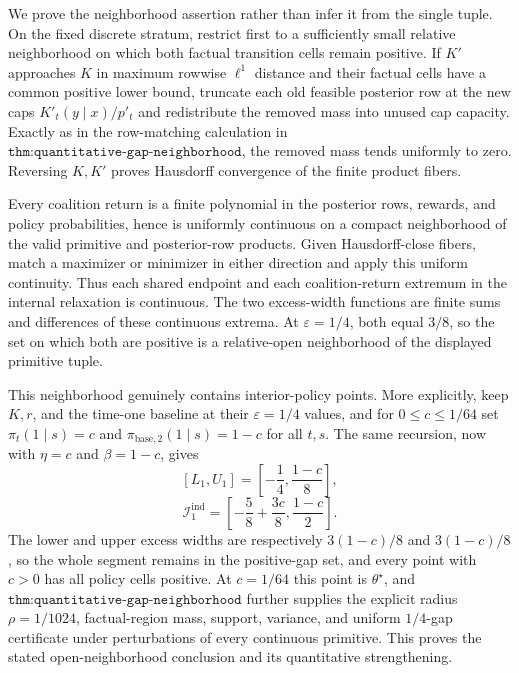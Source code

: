 We prove the neighborhood assertion rather than infer it from the single tuple.  On the fixed discrete stratum, restrict first to a sufficiently small relative neighborhood on which both factual transition cells remain positive.  If \(K'\) approaches \(K\) in maximum rowwise \(\ell^1\) distance and their factual cells have a common positive lower bound, truncate each old feasible posterior row at the new caps \(K'_t(y\mid x)/p'_t\) and redistribute the removed mass into unused cap capacity.  Exactly as in the row-matching calculation in \(\texttt{thm:quantitative-gap-neighborhood}\), the removed mass tends uniformly to zero.  Reversing \(K,K'\) proves Hausdorff convergence of the finite product fibers.

Every coalition return is a finite polynomial in the posterior rows, rewards, and policy probabilities, hence is uniformly continuous on a compact neighborhood of the valid primitive and posterior-row products.  Given Hausdorff-close fibers, match a maximizer or minimizer in either direction and apply this uniform continuity.  Thus each shared endpoint and each coalition-return extremum in the internal relaxation is continuous.  The two excess-width functions are finite sums and differences of these continuous extrema.  At \(\varepsilon=1/4\), both equal \(3/8\), so the set on which both are positive is a relative-open neighborhood of the displayed primitive tuple.

This neighborhood genuinely contains interior-policy points.  More explicitly, keep \(K,r\), and the time-one baseline at their \(\varepsilon=1/4\) values, and for \(0\le c\le1/64\) set \(\pi_t(1\mid s)=c\) and \(\pi_{\mathrm{base},2}(1\mid s)=1-c\) for all \(t,s\).  The same recursion, now with \(\eta=c\) and \(\beta=1-c\), gives
\[
 [L_1,U_1]=\left[-\frac14,\frac{1-c}{8}\right],
\]
\[
 \mathcal I_1^{\mathrm{ind}}
 =\left[-\frac58+\frac{3c}{8},\frac{1-c}{2}\right].
\]
The lower and upper excess widths are respectively \(3(1-c)/8\) and \(3(1-c)/8\), so the whole segment remains in the positive-gap set, and every point with \(c>0\) has all policy cells positive.  At \(c=1/64\) this point is \(\theta^\star\), and \(\texttt{thm:quantitative-gap-neighborhood}\) further supplies the explicit radius \(\rho=1/1024\), factual-region mass, support, variance, and uniform \(1/4\)-gap certificate under perturbations of every continuous primitive.  This proves the stated open-neighborhood conclusion and its quantitative strengthening.